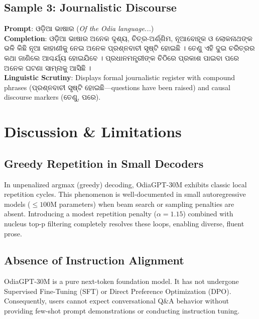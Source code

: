 \documentclass[10pt,twocolumn,letterpaper]{article}
\newcommand{\odia}[1]{{\odiafont #1}}
\newcommand{\odia}[1]{\textit{#1}}
\begin{document}
\subsection{Sample 3: Journalistic Discourse}
\noindent\textbf{Prompt}: \odia{ଓଡ଼ିଆ ଭାଷାର} (\textit{Of the Odia language...})\\
\noindent\textbf{Completion}: \odia{ଓଡ଼ିଆ ଭାଷାର ଅନେକ ଦୃଶ୍ୟ, ଚିତ୍ର-ଅର୍ଣ୍ଣିମ, ନୂଆବୋହୂକ ଓ ଲୋକନାଥଙ୍କ ଭଳି କିଛି ନୂଆ କାହାଣୀକୁ ନେଇ ଅନେକ ପ୍ରଶ୍ନବାଚୀ ସୃଷ୍ଟି ହୋଇଛି । ତେଣୁ ଏହି ଦୁଇ ଚରିତ୍ରର କଥା ଜାଣିଲେ ଆଶ୍ଚର୍ଯ୍ୟ ହୋଇଯିବେ । ପ୍ରଧାନମନ୍ତ୍ରୀଙ୍କ ଚିଠିରେ ପ୍ରକାଶ ପାଇବା ପରେ ଅନେକ ଘଟଣା ସାମ୍ନାକୁ ଆସିଛି ।}\\
\noindent\textbf{Linguistic Scrutiny}: Displays formal journalistic register with compound phrases (\odia{ପ୍ରଶ୍ନବାଚୀ ସୃଷ୍ଟି ହୋଇଛି}---questions have been raised) and causal discourse markers (\odia{ତେଣୁ}, \odia{ପରେ}).

\section{Discussion \& Limitations}

\subsection{Greedy Repetition in Small Decoders}
In unpenalized argmax (greedy) decoding, OdiaGPT-30M exhibits classic local repetition cycles. This phenomenon is well-documented in small autoregressive models ($\le 100\text{M}$ parameters) when beam search or sampling penalties are absent. Introducing a modest repetition penalty ($\alpha = 1.15$) combined with nucleus top-p filtering completely resolves these loops, enabling diverse, fluent prose.

\subsection{Absence of Instruction Alignment}
OdiaGPT-30M is a pure next-token foundation model. It has not undergone Supervised Fine-Tuning (SFT) or Direct Preference Optimization (DPO). Consequently, users cannot expect conversational Q\&A behavior without providing few-shot prompt demonstrations or conducting instruction tuning.

\end{document}

